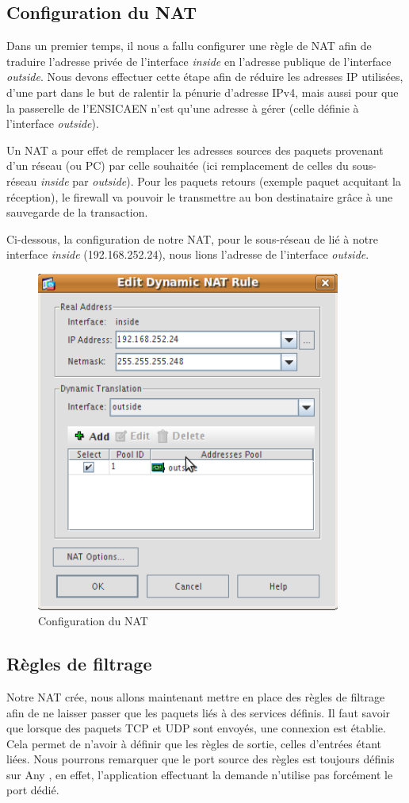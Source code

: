 \documentclass[a4paper,12pt]{article}
\begin{document}
\subsection{Configuration du NAT}
Dans un premier temps, il nous a fallu configurer une règle de NAT afin de traduire l'adresse privée de l'interface \textit{inside} en l'adresse publique de
l'interface \textit{outside}. Nous devons effectuer cette étape afin de réduire les adresses IP utilisées, d'une part dans le but de ralentir la pénurie d'adresse
IPv4, mais aussi pour que la passerelle de l'ENSICAEN n'est qu'une adresse à gérer (celle définie à l'interface \textit{outside}).

Un NAT a pour effet de remplacer les adresses sources des paquets provenant d'un réseau (ou PC) par celle souhaitée (ici remplacement de celles du sous-réseau \textit{inside} par \textit{outside}). Pour les paquets retours (exemple paquet acquitant la réception), le firewall va pouvoir le transmettre
au bon destinataire grâce à une sauvegarde de la transaction.

Ci-dessous, la configuration de notre NAT, pour le sous-réseau de lié à notre interface \textit{inside} (192.168.252.24), nous lions l'adresse de l'interface \textit{outside}.
\begin{figure}[H]
	\center
	\includegraphics[width=10cm]{img/3-natinsideoutside.png}
	\caption{Configuration du NAT}
\end{figure}


\subsection{Règles de filtrage}
Notre NAT crée, nous allons maintenant mettre en place des règles de filtrage afin de ne laisser passer que les paquets liés à des services définis.
Il faut savoir que lorsque des paquets TCP et UDP sont envoyés, une connexion est établie. Cela permet de n'avoir à définir que les règles de sortie, celles
d'entrées étant liées. Nous pourrons remarquer que le port source des règles est toujours définis sur \og Any \fg{}, en effet, l'application effectuant la demande
n'utilise pas forcément le port dédié.
\end{document}
